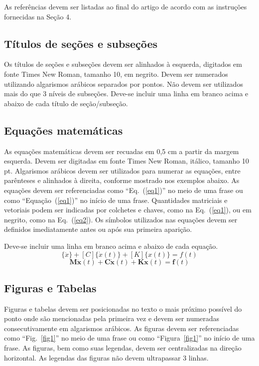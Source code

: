 \documentclass[10pt,fleqn,a4paper,twoside]{article}
\begin{document}
As referências devem ser listadas ao final do artigo de acordo com as instruções fornecidas na Seção 4.

\subsection{Títulos de seções e subseções}

Os títulos de seções e subseções devem ser alinhados à esquerda, digitados em fonte Times New Roman, tamanho 10, em negrito. Devem ser numerados utilizando algarismos arábicos separados por pontos. Não devem ser utilizados mais do que 3 níveis de subseções. Deve-se incluir uma linha em branco acima e abaixo de cada título de seção/subseção.

\subsection{Equações matemáticas}

As equações matemáticas devem ser recuadas em 0,5 cm a partir da margem esquerda. Devem ser digitadas em fonte Times New Roman, itálico, tamanho 10 pt. Algarismos arábicos devem ser utilizados para numerar as equações, entre parênteses e alinhados à direita, conforme mostrado nos exemplos abaixo. As equações devem ser referenciadas como ``Eq.~(\ref{eq1})'' no meio de uma frase ou como ``Equação~(\ref{eq1})'' no início de uma frase. Quantidades matriciais e vetoriais podem ser indicadas por colchetes e chaves, como na Eq.~(\ref{eq1}), ou em negrito, como na Eq.~(\ref{eq2}). Os símbolos utilizados nas equações devem ser definidos imediatamente antes ou após sua primeira aparição.

Deve-se incluir uma linha em branco acima e abaixo de cada equação.
\begin{equation}
[M]\{\ddot{x}\}+[C]\{\dot{x}(t)\}+[K]\{x(t)\}={f(t)} 
\label{eq1}
\end{equation}
\begin{equation}
\mathbf{M\ddot{x}}(t)+\mathbf{C\dot{x}}(t)+\mathbf{Kx}(t)=\mathbf{f}(t) 
\label{eq2}
\end{equation}

\subsection{Figuras e Tabelas}

Figuras e tabelas devem ser posicionadas no texto o mais próximo possível do ponto onde são mencionadas pela primeira vez e devem ser numeradas consecutivamente em algarismos arábicos. As figuras devem ser referenciadas como ``Fig.~\ref{fig1}'' no meio de uma frase ou como ``Figura~\ref{fig1}'' no início de uma frase. As figuras, bem como suas legendas, devem ser centralizadas na direção horizontal. As legendas das figuras não devem ultrapassar 3 linhas.
\end{document}
